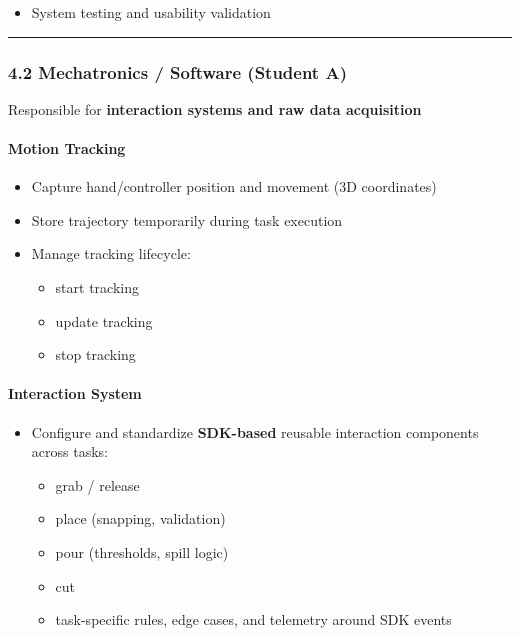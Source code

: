 \documentclass[11pt]{article}
\begin{document}
\begin{itemize}
\item System testing and usability validation
\end{itemize}

\hrule


\subsubsection*{4.2 Mechatronics / Software (Student A)}


Responsible for \textbf{interaction systems and raw data acquisition}


\paragraph*{Motion Tracking}

\begin{itemize}
\item Capture hand/controller position and movement (3D coordinates)
\item Store trajectory temporarily during task execution
\item Manage tracking lifecycle:
\begin{itemize}
\item start tracking
\item update tracking
\item stop tracking
\end{itemize}
\end{itemize}

\paragraph*{Interaction System}

\begin{itemize}
\item Configure and standardize \textbf{SDK-based} reusable interaction components across tasks:
\begin{itemize}
\item grab / release
\item place (snapping, validation)
\item pour (thresholds, spill logic)
\item cut
\item task-specific rules, edge cases, and telemetry around SDK events
\end{itemize}
\end{itemize}
\end{document}
